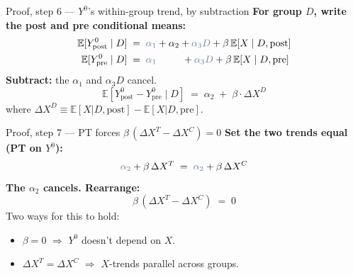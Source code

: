 \documentclass[aspectratio=169,11pt]{beamer}
\begin{document}
\begin{frame}{Proof, step 6 --- $Y^0$'s within-group trend, by subtraction}
\vspace{0.4em}
\textbf{For group $D$, write the post and pre conditional means:}
\vspace{-0.1em}
\begin{align*}
\mathbb{E}[Y^0_{\text{post}} \mid D] \;&=\; \textcolor{warmgray}{\alpha_1} + \alpha_2 + \textcolor{warmgray}{\alpha_3 D} + \beta\,\mathbb{E}[X \mid D, \text{post}] \\
\mathbb{E}[Y^0_{\text{pre}}  \mid D] \;&=\; \textcolor{warmgray}{\alpha_1} \phantom{\;+\;\alpha_2}\, + \textcolor{warmgray}{\alpha_3 D} + \beta\,\mathbb{E}[X \mid D, \text{pre}]
\end{align*}
\vspace{-0.1em}
\textbf{Subtract:} the \textcolor{warmgray}{$\alpha_1$ and $\alpha_3 D$} cancel.
\[
\boxed{\;\mathbb{E}[Y^0_{\text{post}} - Y^0_{\text{pre}} \mid D] \;=\; \alpha_2 \;+\; \beta \cdot \Delta X^D\;}
\]
where $\Delta X^D \equiv \mathbb{E}[X|D,\text{post}] - \mathbb{E}[X|D,\text{pre}]$.
\end{frame}

\begin{frame}{Proof, step 7 --- PT forces $\beta\,(\Delta X^T - \Delta X^C) = 0$}
\vspace{0.7em}
\textbf{Set the two trends equal (PT on $Y^0$):}
\[
\textcolor{warmgray}{\alpha_2} + \beta\,\Delta X^T \;=\; \textcolor{warmgray}{\alpha_2} + \beta\,\Delta X^C
\]
\vspace{0.2em}
\textbf{The $\alpha_2$ cancels. Rearrange:}
\[
\boxed{\;\; \beta \, (\Delta X^T - \Delta X^C) \;=\; 0 \;\;}
\]
\vspace{0.4em}
Two ways for this to hold:
\begin{itemize}\small
  \item $\beta = 0$ \;$\Rightarrow$\; $Y^0$ doesn't depend on $X$.
  \item $\Delta X^T = \Delta X^C$ \;$\Rightarrow$\; $X$-trends parallel across groups.
\end{itemize}
\end{frame}
\end{document}
